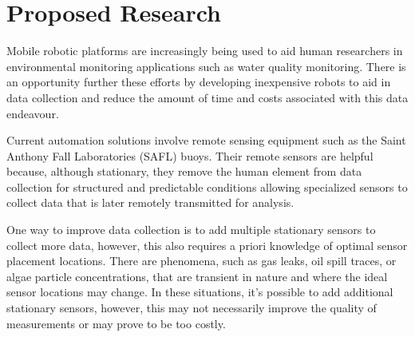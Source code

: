 \section{Proposed Research} 




	Mobile robotic platforms are increasingly being used to aid human researchers in environmental monitoring applications such as water quality monitoring. There is an opportunity further these efforts by developing inexpensive robots to aid in data collection and reduce the amount of time and costs associated with this data endeavour. 

	Current automation solutions involve remote sensing equipment such as the Saint Anthony Fall Laboratories (SAFL) buoys. Their remote sensors are helpful because, although stationary, they remove the human element from data collection for structured and predictable conditions allowing specialized sensors to collect data that is later remotely transmitted for analysis. 


	One way to improve data collection is to add multiple stationary sensors to collect more data, however, this also requires a priori knowledge of optimal sensor placement locations. There are phenomena, such as gas leaks, oil spill traces, or algae particle concentrations, that are transient in nature and where the ideal sensor locations may change. In these situations, it's possible to add additional stationary sensors, however, this may not necessarily improve the quality of measurements or may prove to be too costly. 

